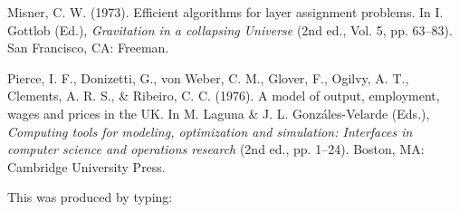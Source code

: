 \documentclass{nCSE2e}
\begin{document}
\begin{thebibliography}{12}
Misner, C. W. (1973). Efficient algorithms for layer assignment
 problems. In I. Gottlob (Ed.), {\em Gravitation in a collapsing
 Universe} (2nd ed., Vol. 5, pp. 63--83). San Francisco, CA: Freeman.

Pierce, I. F., Donizetti, G., von Weber, C. M., Glover, F., Ogilvy,
 A. T., Clements, A. R. S., \& Ribeiro, C. C. (1976). A model of output,
 employment, wages and prices in the UK. In M. Laguna \& J. L.
 Gonz\'{a}les-Velarde (Eds.), {\em{Computing tools for modeling,
 optimization and simulation: Interfaces in computer science and
 operations research}} (2nd  ed., pp. 1--24). Boston, MA: Cambridge
 University Press.

\end{thebibliography}

\bigskip
\noindent This was produced by typing:
\end{document}
